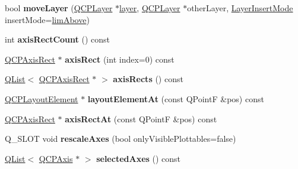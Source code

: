 \begin{DoxyCompactItemize}
\item 
bool {\bfseries move\+Layer} (\hyperlink{class_q_c_p_layer}{Q\+C\+P\+Layer} $\ast$\hyperlink{class_q_custom_plot_aac492da01782820454e9136a8db28182}{layer}, \hyperlink{class_q_c_p_layer}{Q\+C\+P\+Layer} $\ast$other\+Layer, \hyperlink{class_q_custom_plot_a75a8afbe6ef333b1f3d47abb25b9add7}{Layer\+Insert\+Mode} insert\+Mode=\hyperlink{class_q_custom_plot_a75a8afbe6ef333b1f3d47abb25b9add7a56ffb40bbf81e9b5d869cffc88999a36}{lim\+Above})\hypertarget{class_q_custom_plot_ae896140beff19424e9e9e02d6e331104}{}\label{class_q_custom_plot_ae896140beff19424e9e9e02d6e331104}

\item 
int {\bfseries axis\+Rect\+Count} () const \hypertarget{class_q_custom_plot_a340fa24b1607e445cedda9685670ead3}{}\label{class_q_custom_plot_a340fa24b1607e445cedda9685670ead3}

\item 
\hyperlink{class_q_c_p_axis_rect}{Q\+C\+P\+Axis\+Rect} $\ast$ {\bfseries axis\+Rect} (int index=0) const \hypertarget{class_q_custom_plot_ad652a2b97827e95a6939e0838a251249}{}\label{class_q_custom_plot_ad652a2b97827e95a6939e0838a251249}

\item 
\hyperlink{class_q_list}{Q\+List}$<$ \hyperlink{class_q_c_p_axis_rect}{Q\+C\+P\+Axis\+Rect} $\ast$ $>$ {\bfseries axis\+Rects} () const \hypertarget{class_q_custom_plot_a040194871f98aa377fab056a83a24d7a}{}\label{class_q_custom_plot_a040194871f98aa377fab056a83a24d7a}

\item 
\hyperlink{class_q_c_p_layout_element}{Q\+C\+P\+Layout\+Element} $\ast$ {\bfseries layout\+Element\+At} (const Q\+PointF \&pos) const \hypertarget{class_q_custom_plot_a9e12b616019b4e08fa59a74d8176a5c4}{}\label{class_q_custom_plot_a9e12b616019b4e08fa59a74d8176a5c4}

\item 
\hyperlink{class_q_c_p_axis_rect}{Q\+C\+P\+Axis\+Rect} $\ast$ {\bfseries axis\+Rect\+At} (const Q\+PointF \&pos) const \hypertarget{class_q_custom_plot_a2099c3973fa19b518f20293de52bdaea}{}\label{class_q_custom_plot_a2099c3973fa19b518f20293de52bdaea}

\item 
Q\+\_\+\+S\+L\+OT void {\bfseries rescale\+Axes} (bool only\+Visible\+Plottables=false)\hypertarget{class_q_custom_plot_a8898682337c33b27b42b85218a8d4c0b}{}\label{class_q_custom_plot_a8898682337c33b27b42b85218a8d4c0b}

\item 
\hyperlink{class_q_list}{Q\+List}$<$ \hyperlink{class_q_c_p_axis}{Q\+C\+P\+Axis} $\ast$ $>$ {\bfseries selected\+Axes} () const \hypertarget{class_q_custom_plot_a520f3ebc6527193da2540f2c82439e83}{}\label{class_q_custom_plot_a520f3ebc6527193da2540f2c82439e83}


\end{DoxyCompactItemize}
